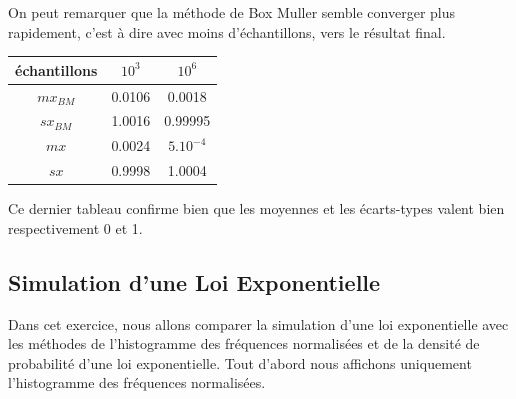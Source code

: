 \documentclass[a4paper,oneside]{article}
\begin{document}
 On peut remarquer que la méthode de Box Muller semble converger plus rapidement, c'est à dire avec moins d'échantillons, vers le résultat final.
 
 
 \begin{center}
 \begin{tabular}{|c|c|c|}
 
 	\hline
 	échantillons & $10^3$ & $10^6$\\
 	\hline
 	$mx_{BM}$ & 0.0106 & 0.0018 \\ 
 	$sx_{BM}$ & 1.0016 & 0.99995 \\
 	$mx$ & 0.0024 & $5.10^{-4}$ \\
 	$sx$ & 0.9998 & 1.0004 \\
 	\hline
 	
 \end{tabular}
  \end{center}
  	
Ce dernier tableau confirme bien que les moyennes et les écarts-types valent bien respectivement 0 et 1.

\newpage

 \subsection{Simulation d'une Loi Exponentielle}
 Dans cet exercice, nous allons comparer la simulation d'une loi exponentielle avec les méthodes de l'histogramme des fréquences normalisées et de la densité de probabilité d'une loi exponentielle.
 Tout d'abord nous affichons uniquement l'histogramme des fréquences normalisées.
 
\end{document}
